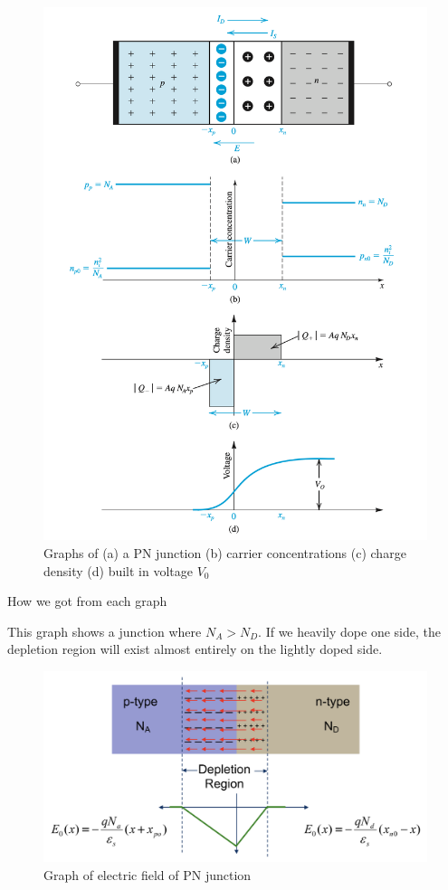 \begin{figure}[htb]
    \centering
    \includegraphics[scale=0.6]{figs/ch03/3_graph.png}
    \caption{Graphs of (a) a PN junction (b) carrier concentrations (c) charge density (d) built in voltage $V_0$}
    \label{fig:3figs}
\end{figure}
\begin{todo}
    \item How we got from each graph
\end{todo}
This graph shows a junction where $N_A > N_D$. If we heavily dope one side, the depletion region will exist almost entirely on the lightly doped side.

\begin{figure}[H]
    \centering
    \includegraphics[scale=0.5]{figs/ch03/concentration_reader.png}
    \caption{Graph of electric field of PN junction}
    \label{fig:electric_fields_pn}
\end{figure}

